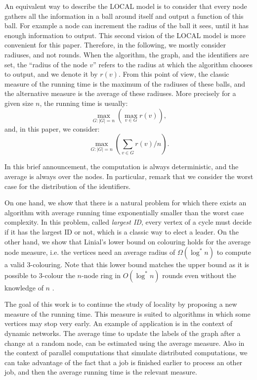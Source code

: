 \documentclass{sig-alternate-2013}
\begin{document}
An equivalent way to describe the LOCAL model is to consider that every node gathers all the information in a ball around itself and output a function of this ball. For example a node can increment the radius of the ball it sees, until it has enough information to output. This second vision of the LOCAL model is more convenient for this paper. Therefore, in the following, we mostly consider radiuses, and not rounds. When the algorithm, the graph, and the identifiers are set, the ``radius of the node $v$'' refers to the radius at which the algorithm chooses to output, and we denote it by $r(v)$. From this point of view, the classic measure of the running time is the maximum of the radiuses of these balls, and the alternative measure is the average of these radiuses. More precisely for a given size $n$, the running time is usually: 
$$\max_{G:|G|=n} \left( \max_{v\in G}r(v)\right),$$ 
and, in this paper, we consider:  
$$\max_{G:|G|=n}\left( \sum_{v\in G}r(v)/n \right).$$
 
In this brief announcement, the computation is always deterministic, and the average is always over the nodes. In particular, remark that we consider the worst case for the distribution of the identifiers. 

On one hand, we show that there is a natural problem for which there exists an algorithm with average running time exponentially smaller than the worst case complexity. In this problem, called \emph{largest ID}, every vertex of a cycle must decide if it has the largest ID or not, which is a classic way to elect a leader. On the other hand, we show that Linial's lower bound on colouring \cite{Linial92} holds for the average node measure, i.e. the vertices need an average radius of $\Omega(\log^*n)$ to compute a valid 3-colouring. Note that this lower bound matches the upper bound as it is possible to 3-colour the $n$-node ring in $O(\log^*n)$ rounds even without the knowledge of $n$ \cite{KormanSV13}\cite{Musto11}.


The goal of this work is to continue the study of locality by proposing a new measure of the running time. This measure is suited to algorithms in which some vertices may stop very early. An example of application is in the context of dynamic networks. The average time to update the labels of the graph after a change at a random node, can be estimated using the average measure. Also in the context of parallel computations that simulate distributed computations, we can take advantage of the fact that a job is finished earlier to process an other job, and then the average running time is the relevant measure. 
\end{document}
